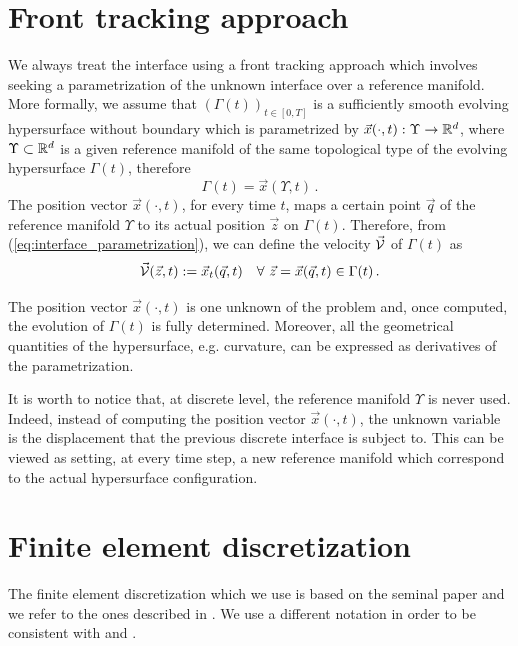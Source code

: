 \section{Front tracking approach}\label{sec:front_tracking_approach}
We always treat the interface using a front tracking approach which involves
seeking a parametrization of the unknown interface over a reference manifold.
More formally, we assume that $(\Gamma(t))_{t\in [0,T]}$ is a sufficiently
smooth evolving hypersurface without boundary which is parametrized by
$\vec x(\cdot,t):\Upsilon\to{\mathbb R}^d$, where $\Upsilon\subset {\mathbb R}^d$ is a given
reference manifold of the same topological type of the evolving hypersurface
$\Gamma(t)$, therefore
\begin{equation}\label{eq:interface_parametrization}
\Gamma(t) = \vec x(\Upsilon,t)\,.
\end{equation}
The position vector $\vec x(\cdot,t)$, for every time $t$, maps a certain point
$\vec{q}$ of the reference manifold $\Upsilon$ to its actual position
$\vec{z}$ on $\Gamma(t)$. Therefore, from (\ref{eq:interface_parametrization}),
we can define the velocity $\vec{\mathcal{V}}$ of $\Gamma(t)$ as
\begin{equation} \label{eq:V}
\vec{\mathcal{V}}(\vec z, t) := \vec x_t(\vec q, t) \quad
\forall\ \vec z = \vec x(\vec q,t) \in \Gamma(t)\,.
\end{equation}

The position vector $\vec x(\cdot,t)$ is one unknown of the problem and, once
computed, the evolution of $\Gamma(t)$ is fully determined. Moreover, all the
geometrical quantities of the hypersurface, e.g. curvature, can be expressed as
derivatives of the parametrization.

It is worth to notice that, at discrete level, the reference manifold
$\Upsilon$ is never used. Indeed, instead of computing the position vector
$\vec x(\cdot,t)$, the unknown variable is the displacement that the previous
discrete interface is subject to. This can be viewed as setting, at every time
step, a new reference manifold which correspond to the actual hypersurface
configuration.

\section{Finite element discretization}\label{sec:geometric_pdes_fem}
The finite element discretization which we use is based on the seminal paper
\cite{Dziuk91} and we refer to the ones described in
\cite{triplej,triplejMC,gflows3d}. We use a different notation in order to be
consistent with \cite{spurious} and \cite{stokesfitted}.


